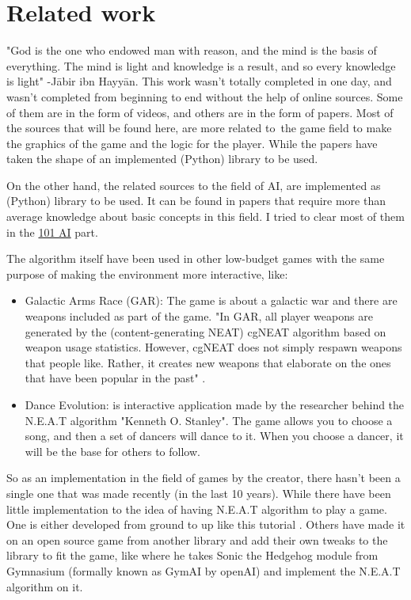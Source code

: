 \chapter{Related work}

"God is the one who endowed man with reason, and the mind is the basis of everything. The mind is light and knowledge is a result, and so every knowledge is light" -Jābir ibn Hayyān. This work wasn’t totally completed in one day, and wasn’t completed from beginning to end without the help of online sources. Some of them are in the form of videos, and others are in the form of papers. Most of the sources that will be found here, are more related to the game field to make the graphics of the game and the logic for the player. While the papers have taken the shape of an implemented (Python) library to be used.

On the other hand, the related sources to the field of AI, are implemented as (Python) library to be used. It can be found in papers that require more than average knowledge about basic concepts in this field. I tried to clear most of them in the \hyperref[sec:101-ai]{101 AI} part.

The algorithm itself have been used in other low-budget games with the same purpose of making the environment more interactive, like:

\begin{itemize}
\item Galactic Arms Race (GAR): The game is about a galactic war and there are weapons included as part of the game. "In GAR, all player weapons are generated by the (content-generating NEAT) cgNEAT algorithm based on weapon usage statistics. However, cgNEAT does not simply respawn weapons that people like. Rather, it creates new weapons that elaborate on the ones that have been popular in the past" .

\item Dance Evolution: is interactive application made by the researcher behind the N.E.A.T algorithm "Kenneth O. Stanley". The game allows you to choose a song, and then a set of dancers will dance to it. When you choose a dancer, it will be the base for others to follow.

\end{itemize}

So as an implementation in the field of games by the creator, there hasn't been a single one that was made recently (in the last 10 years). While there have been little implementation to the idea of having N.E.A.T algorithm to play a game. One is either developed from ground to up like this tutorial .  Others have made it on an open source game from another library and add their own tweaks to the library to fit the game, like  where he takes Sonic the Hedgehog module from Gymnasium (formally known as GymAI by openAI) and implement the N.E.A.T algorithm on it.

